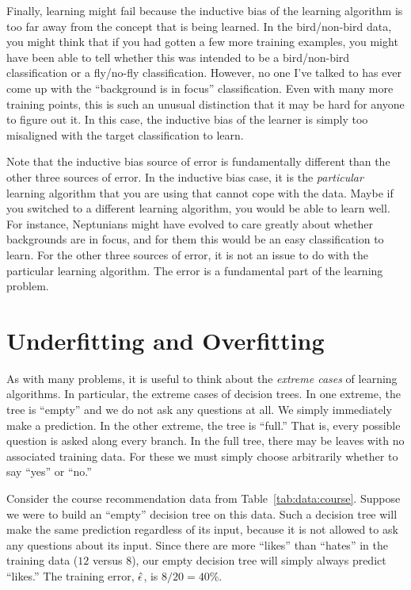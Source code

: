 Finally, learning might fail because the inductive bias of the
learning algorithm is too far away from the concept that is being
learned.  In the bird/non-bird data, you might think that if you had
gotten a few more training examples, you might have been able to tell
whether this was intended to be a bird/non-bird classification or a
fly/no-fly classification.  However, no one I've talked to has ever
come up with the ``background is in focus'' classification.  Even with
many more training points, this is such an unusual distinction that it
may be hard for anyone to figure out it.  In this case, the inductive
bias of the learner is simply too misaligned with the target
classification to learn.

Note that the inductive bias source of error is fundamentally
different than the other three sources of error.  In the inductive
bias case, it is the \emph{particular} learning algorithm that you are
using that cannot cope with the data.  Maybe if you switched to a
different learning algorithm, you would be able to learn well.  For
instance, Neptunians might have evolved to care greatly about whether
backgrounds are in focus, and for them this would be an easy
classification to learn.  For the other three sources of error, it is
not an issue to do with the particular learning algorithm.  The error
is a fundamental part of the learning problem.

\section{Underfitting and Overfitting}

As with many problems, it is useful to think about the \emph{extreme
  cases} of learning algorithms.  In particular, the extreme cases of
decision trees.  In one extreme, the tree is ``empty'' and we do not
ask any questions at all.  We simply immediately make a prediction.  In
the other extreme, the tree is ``full.''  That is, every possible
question is asked along every branch.  In the full tree, there may be
leaves with no associated training data.  For these we must simply
choose arbitrarily whether to say ``yes'' or ``no.''

Consider the course recommendation data from
Table~\ref{tab:data:course}.  Suppose we were to build an ``empty''
decision tree on this data.  Such a decision tree will make the same
prediction regardless of its input, because it is not allowed to ask
any questions about its input.  Since there are more ``likes'' than
``hates'' in the training data ($12$ versus $8$), our empty decision
tree will simply always predict ``likes.''  The training error, $\hat
{\epsilon}$, is $8/20 = 40\%$.

